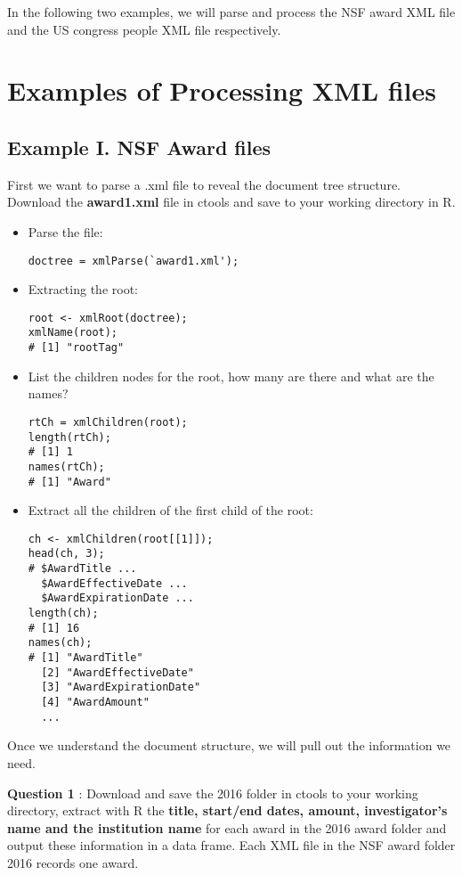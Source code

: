 \documentclass[12pt]{article}
\numberwithin{equation}{subsection}
\begin{document}
\noindent
In the following two examples, we will parse and process the NSF award XML file and the US congress people XML file respectively.

\section{Examples of Processing XML files}

\subsection{Example I. NSF Award files}

\noindent First we want to parse a .xml file to reveal the document tree structure. Download the \textbf{award1.xml} file in ctools and save to your working directory in R.
\begin{itemize}
\item Parse the file:
\begin{verbatim}
doctree = xmlParse(`award1.xml');
\end{verbatim}


\item Extracting the root:
\begin{verbatim}
root <- xmlRoot(doctree);
xmlName(root);
# [1] "rootTag"
\end{verbatim}

\item List the children nodes for the root, how many are there and what are the names?
\begin{verbatim}
rtCh = xmlChildren(root);
length(rtCh);
# [1] 1
names(rtCh);
# [1] "Award"
\end{verbatim}

\item Extract all the children of the first child of the root:
\begin{verbatim}
ch <- xmlChildren(root[[1]]); 
head(ch, 3);
# $AwardTitle ...
  $AwardEffectiveDate ... 
  $AwardExpirationDate ...
length(ch);
# [1] 16
names(ch);
# [1] "AwardTitle"         
  [2] "AwardEffectiveDate" 
  [3] "AwardExpirationDate"
  [4] "AwardAmount"
  ...
\end{verbatim}
\end{itemize}
\noindent 
Once we understand the document structure, we will pull out the information we need.\newline

\textbf{Question 1} : Download and save the 2016 folder in ctools to your working directory, extract with R the \textbf{title, start/end dates, amount, investigator's name and the institution name} for each award in the 2016 award folder and output these information in a data frame. Each XML file in the NSF award folder 2016 records one award. \newline
\end{document}
